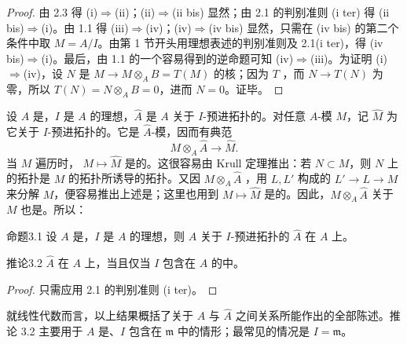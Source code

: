 \begin{proof}
由 2.3 得 (i)$\Rightarrow$(ii)；(ii)$\Rightarrow$(ii bis) 显然；由 2.1 的判别准则 (i ter) 得 (ii bis)$\Rightarrow$(i)。由 1.1 得 (iii)$\Rightarrow$(iv)；(iv)$\Rightarrow$(iv bis) 显然，只需在 (iv bis) 的第二个条件中取 $M=A/I$。由第 1 节开头用理想表述的判别准则及 2.1(i ter)，得 (iv bis)$\Rightarrow$(i)。最后，由 1.1 的一个容易得到的逆命题可知 (iv)$\Rightarrow$(iii)。为证明 (i)$\Rightarrow$(iv)，设 $N$ 是 $M\to M\otimes_A B=T(M)$ 的核；因为 $T$ ，而 $N\to T(N)$ 为零，所以 $T(N)=N\otimes_A B=0$，进而 $N=0$。证毕。
\end{proof}

设 $A$ 是，$I$ 是 $A$ 的理想，$\widehat A$ 是 $A$ 关于 $I$-预进拓扑的。对任意 $A$-模 $M$，记 $\widehat M$ 为它关于 $I$-预进拓扑的。它是 $\widehat A$-模，因而有典范
\[
M\otimes_A\widehat A\longrightarrow\widehat M.
\]
当 $M$ 遍历时， $M\mapsto\widehat M$ 是的。这很容易由 Krull 定理推出：若 $N\subset M$，则 $N$ 上的拓扑是 $M$ 的拓扑所诱导的拓扑。又因 $M\otimes_A\widehat A$ ，用 $L,L'$ 构成的 $L'\to L\to M$ 来分解 $M$，便容易推出上述是；这里也用到 $M\mapsto\widehat M$ 是的。因此，$M\otimes_A\widehat A$ 关于 $M$ 也是。所以：

\begin{SGAresult}{命题}{3.1}
设 $A$ 是，$I$ 是 $A$ 的理想，则 $A$ 关于 $I$-预进拓扑的 $\widehat A$ 在 $A$ 上。
\end{SGAresult}
\begin{SGAresult}{推论}{3.2}
$\widehat A$ 在 $A$ 上，当且仅当 $I$ 包含在 $A$ 的中。
\end{SGAresult}
\begin{proof}
只需应用 2.1 的判别准则 (i ter)。
\end{proof}
就线性代数而言，以上结果概括了关于 $A$ 与 $\widehat A$ 之间关系所能作出的全部陈述。推论 3.2 主要用于 $A$ 是、$I$ 包含在 $\mathfrak m$ 中的情形；最常见的情况是 $I=\mathfrak m$。

